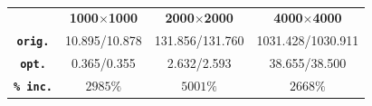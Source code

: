 \documentclass[11pt,twocolumn,a4paper]{article}
\begin{document}
\vspace{-0.2cm}
\begin{table}[h]
\begin{adjustwidth}{-0.15cm}{}
\small
\centering
\begin{tabular}{c|c|c|c}
    & \textbf{1000$\times$1000} & \textbf{2000$\times$2000} & \textbf{4000$\times$4000}   \\
\textbf{\texttt{orig.}} & 10.895/10.878 & 131.856/131.760 & 1031.428/1030.911 \\
\textbf{\texttt{opt.}} & 0.365/0.355 & 2.632/2.593 & 38.655/38.500 \\
\textbf{\texttt{\% inc.}} & $2985\%$ & $5001\%$ & $2668\%$ \\
\end{tabular}
\caption{}
\label{finalResults}
\end{adjustwidth}
\end{table}\par
\vspace{-0.22cm}

\vspace{-0.3cm}
\printbibliography[title={Bibliography}]
\end{document}
